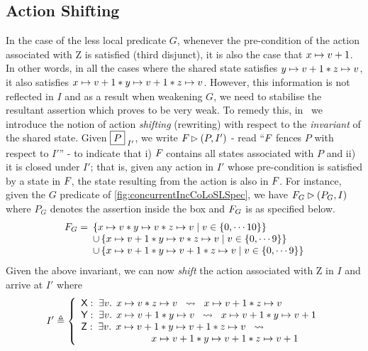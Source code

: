 \subsection{Action Shifting}\label{subsec:shift}
In the case of the less local predicate $G$, whenever the pre-condition of the action associated with \textsf{Z} is satisfied (third disjunct), it is also the case that $x \mapsto v+1$. In other words, in all the cases where the shared state satisfies $y \mapsto v+1 * z \mapsto v$, it also satisfies $x \mapsto v+1 * y \mapsto v+1 * z \mapsto v$. However, this information is not reflected in $I$ and as a result when weakening $G$, we need to stabilise the resultant assertion which proves to be very weak. To remedy this, in \colosl\ we introduce the notion of action \emph{shifting} (rewriting) with respect to the \emph{invariant} of the shared state. Given $\boxed{P}_{\; I'}$, we write $F_{} \rhd (P, I')$ - read ``$F_{}$ fences $P$ with respect to $I'$'' - to indicate that i) $F_{}$ contains all states associated with $P$ and ii) it is closed under $I'$; that is, given any action in $I'$ whose pre-condition is satisfied by a state in $F_{}$, the state resulting from the action is also in $F_{}$. For instance, given the $G$ predicate of \fig\ref{fig:concurrentIncCoLoSLSpec}, we have $F_{G} \rhd (P_G, I)$ where $P_G$ denotes the assertion inside the box and $F_{G}$ is as specified below.
%
\[
	\begin{array}{l l}
		F_{G} = \hspace*{-5pt}& \left\{x \mapsto v * y \mapsto v * z \mapsto v \;|\; v \in \{0, \cdots 10\} \right\} \\
		& \cup \left\{x \mapsto v+1 * y \mapsto v * z \mapsto v \;|\; v \in \{0, \cdots 9 \} \right\} \\
		& \cup \left\{x \mapsto v+1 * y \mapsto v+1 * z \mapsto v \;|\; v \in \{0, \cdots 9\} \right\}\\
	\end{array}
\]
Given the above invariant, we can now \emph{shift} the action associated with \textsf{Z} in $I$ and arrive at $I'$ where
%
\[
	I' \triangleq \left\{
		\begin{array}{l}
			\textsf{X}:\; \exists v.\,\; x \mapsto v * z \mapsto v  \hspace*{0.2cm}\rightsquigarrow\hspace*{0.2cm}  x \mapsto v+1 * z \mapsto v\\
			\textsf{Y}:\; \exists v.\,\; x \mapsto v+1 * y \mapsto v  \hspace*{0.2cm}\rightsquigarrow\hspace*{0.2cm}  x \mapsto v+1 * y \mapsto v+1\\
			\textsf{Z}:\; \exists v.\,\; x \mapsto v+1 *  y \mapsto v+1 * z \mapsto v\hspace*{0.2cm}\rightsquigarrow\\
			\hspace*{2.5cm} x \mapsto v+1 * y \mapsto v+1 * z \mapsto v+1\\
		\end{array}			
	\right.
\]
